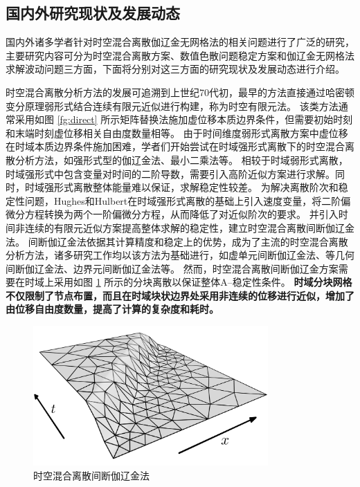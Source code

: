\subsection{国内外研究现状及发展动态}

国内外诸多学者针对时空混合离散伽辽金无网格法的相关问题进行了广泛的研究，主要研究内容可分为时空混合离散方案、数值色散问题稳定方案和伽辽金无网格法求解波动问题三方面，下面将分别对这三方面的研究现状及发展动态进行介绍。

时空混合离散分析方法的发展可追溯到上世纪70代初\cite{argyris1969a,Zhong2005,Li2017a}，最早的方法直接通过哈密顿变分原理弱形式结合连续有限元近似进行构建，称为时空有限元法。
该类方法通常采用如图 \ref{fg:direct} 所示矩阵替换法施加虚位移本质边界条件，但需要初始时刻和末端时刻虚位移相关自由度数量相等。
由于时间维度弱形式离散方案中虚位移在时域本质边界条件施加困难，学者们开始尝试在时域强形式离散下的时空混合离散分析方法，如强形式型的伽辽金法\cite{vondanwitz2023}、最小二乘法\cite{epstein2024}等。
相较于时域弱形式离散，时域强形式中包含变量对时间的二阶导数，需要引入高阶近似方案进行求解。同时，时域强形式离散整体能量难以保证，求解稳定性较差。
为解决离散阶次和稳定性问题，Hughes和Hulbert\cite{hughes1988,hulbert1990}在时域强形式离散的基础上引入速度变量，将二阶偏微分方程转换为两个一阶偏微分方程，从而降低了对近似阶次的要求。
并引入时间非连续的有限元近似方案提高整体求解的稳定性，建立时空混合离散间断伽辽金法。
间断伽辽金法依据其计算精度和稳定上的优势，成为了主流的时空混合离散分析方法，诸多研究工作均以该方法为基础进行，如虚单元间断伽辽金法\cite{xu2025}、等几何间断伽辽金法\cite{lejeunes2024}、边界元间断伽辽金法\cite{hoonhout2023}等。
然而，时空混合离散间断伽辽金方案需要在时域上采用如图 \ref{fg:slab} 所示的分块离散以保证整体A--稳定性条件\cite{hughes1988}。
\textbf{时域分块网格不仅限制了节点布置，而且在时域块状边界处采用非连续的位移进行近似，增加了由位移自由度数量，提高了计算的复杂度和耗时。}

\begin{figure}[!h]
    \centering 
    \includegraphics[width=0.8\textwidth]{figures/wave.png}
    \caption{时空混合离散间断伽辽金法}
    \label{fg:slab}
\end{figure}

